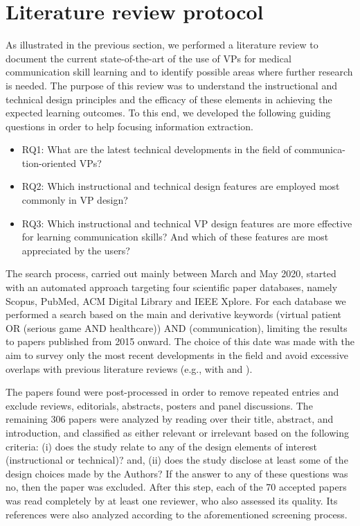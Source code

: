 \section{Literature review protocol}
\label{sec:reviewProtocol}


As illustrated in the previous section, we performed a literature review to document the current state-of-the-art of the use of VPs for medical communication skill learning and to identify possible areas where further research is needed. The purpose of this review was to understand the instructional and technical design principles and the efficacy of these elements in achieving the expected learning outcomes.
To this end, we developed the following guiding questions in order to help focusing information extraction.

\begin{itemize}
\item RQ1: What are the latest technical developments in the field of communica-tion-oriented VPs? 

\item RQ2: Which instructional and technical design features are employed most commonly in VP design?

\item RQ3: Which instructional and technical VP design features are more effective for learning communication skills? And which of these features are most appreciated by the users?


\end{itemize}

The search process, carried out mainly between March and May 2020, started with an automated approach targeting four scientific paper databases, namely Scopus, PubMed, ACM Digital Library and IEEE Xplore. For each database we performed a search based on the main and derivative keywords (virtual patient OR (serious game AND healthcare)) AND (communication), limiting the results to papers published from 2015 onward. The choice of this date was made with the aim to survey only the most recent developments in the field and avoid excessive overlaps with previous literature reviews (e.g., with \cite{peddle2016virtual} and \cite{lee2020effective}). 

The papers found were post-processed in order to remove repeated entries and exclude reviews, editorials, abstracts, posters and panel discussions. The remaining 306 papers were analyzed by reading over their title, abstract, and introduction, and classified as either relevant or irrelevant based on the following criteria: (i) does the study relate to any of the design elements of interest (instructional or technical)? and, (ii) does the study disclose at least some of the design choices made by the Authors? If the answer to any of these questions was no, then the paper was excluded. After this step, each of the 70 accepted papers was read completely by at least one reviewer, who also assessed its quality. Its references were also analyzed according to the aforementioned screening process. 

